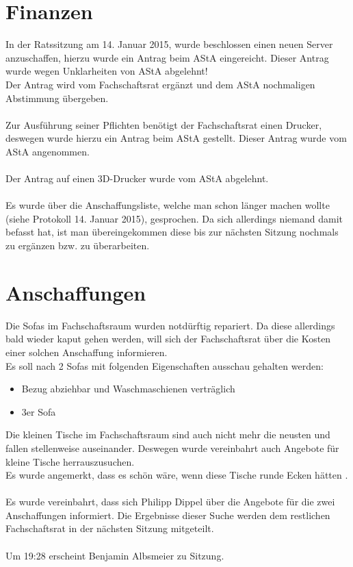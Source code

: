 \documentclass[a4paper, 11pt]{article} %
\newcommand{\abstimmung}[4]{
	\newcounter{summe}
	\setcounter{summe}{#3}
	\addtocounter{summe}{#4}
	\begin{flushleft}
		#1\\
	Es wird über den Antrag abgestimmt.
	\end{flushleft}
	\ifthenelse{\equal{#3}{0}\AND\equal{#4}{0}}{
	\begin{center}
		\textbf{Der Antrag wird einstimmig angenommen.}
	\end{center}
	}{
	\begin{center}
		#2 \ifthenelse{\equal{#2}{1}}{Stimme}{Stimmen} dafür, #3 \ifthenelse{\equal{#3}{1}}{Stimme}{Stimmen} dagegen, #4 \ifthenelse{\equal{#42}{1}}{Enthaltung}{Enthaltungen}\\
		\ifthenelse{#2>\value{summe}}{
		\textbf{Der Antrag ist somit angenommen.}
		}{
		\textbf{Der Antrag ist somit abgelehnt.}
		}
	\end{center}
	}  
}
\begin{document}
\section{Finanzen}
In der Ratssitzung am 14. Januar 2015, wurde beschlossen einen neuen Server anzuschaffen, hierzu wurde ein Antrag beim AStA eingereicht. Dieser Antrag wurde wegen Unklarheiten von AStA abgelehnt! \\
Der Antrag wird vom Fachschaftsrat ergänzt und dem AStA nochmaligen Abstimmung übergeben. \\
\\
Zur Ausführung seiner Pflichten benötigt der Fachschaftsrat einen Drucker, deswegen wurde hierzu ein Antrag beim AStA gestellt. Dieser Antrag wurde vom AStA angenommen. \\
\\
Der Antrag auf einen 3D-Drucker wurde vom AStA abgelehnt. \\
\\
Es wurde über die Anschaffungsliste, welche man schon länger machen wollte (siehe Protokoll 14. Januar 2015), gesprochen. Da sich allerdings niemand damit befasst hat, ist man übereingekommen diese bis zur nächsten Sitzung nochmals zu ergänzen bzw. zu überarbeiten. \\

\section{Anschaffungen}

Die Sofas im Fachschaftsraum wurden notdürftig repariert. Da diese allerdings bald wieder kaput gehen werden, will sich der Fachschaftsrat über die Kosten einer solchen Anschaffung informieren. \\
Es soll nach 2 Sofas mit folgenden Eigenschaften ausschau gehalten werden: 
\begin{itemize}
	\item Bezug abziehbar und Waschmaschienen verträglich
	\item 3er Sofa \\
\end{itemize}
Die kleinen Tische im Fachschaftsraum sind auch nicht mehr die neusten und fallen stellenweise auseinander. Deswegen wurde vereinbahrt auch Angebote für kleine Tische herrauszusuchen. \\
Es wurde angemerkt, dass es schön wäre, wenn diese Tische runde Ecken hätten . \\
\\
Es wurde vereinbahrt, dass sich Philipp Dippel über die Angebote für die zwei Anschaffungen informiert. Die Ergebnisse dieser Suche werden dem restlichen Fachschaftsrat in der nächsten Sitzung mitgeteilt. \\
\\
Um 19:28 erscheint Benjamin Albsmeier zu Sitzung. \\
\end{document}
